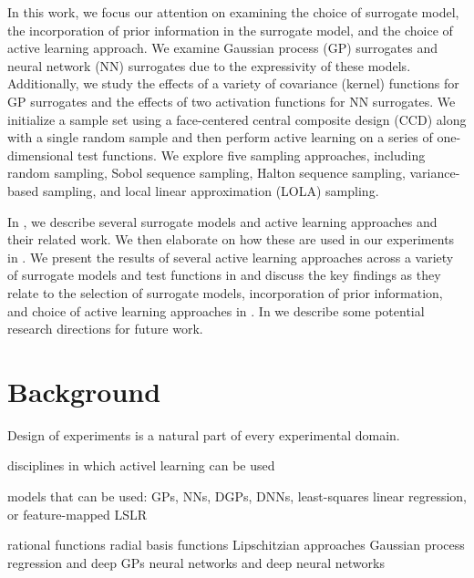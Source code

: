 \documentclass[conference]{IEEEtran}
\begin{document}
	In this work, we focus our attention on examining the choice of surrogate model, the incorporation of prior information in the surrogate model, and the choice of active learning approach. We examine Gaussian process (GP) surrogates and neural network (NN) surrogates due to the expressivity of these models. Additionally, we study the effects of a variety of covariance (kernel) functions for GP surrogates and the effects of two activation functions for NN surrogates. We initialize a sample set using a face-centered central composite design (CCD) along with a single random sample and then perform active learning on a series of one-dimensional test functions. We explore five sampling approaches, including random sampling, Sobol sequence sampling, Halton sequence sampling, variance-based sampling, and local linear approximation (LOLA) sampling.
	
    In , we describe several surrogate models and active learning approaches and their related work. We then elaborate on how these are used in our experiments in . We present the results of several active learning approaches across a variety of surrogate models and test functions in  and discuss the key findings as they relate to the selection of surrogate models, incorporation of prior information, and choice of active learning approaches in . In  we describe some potential research directions for future work.
	
	\section{Background}
	\label{sec:background}
	
	Design of experiments is a natural part of every experimental domain.
	
	disciplines in which activel learning can be used
	
	models that can be used: GPs, NNs, DGPs, DNNs, least-squares linear regression, or feature-mapped LSLR
	
	rational functions \cite{Hendrickx2005SequentialMetamodelling}
	radial basis functions \cite{Mackman2010InvestigationFunctions}
	Lipschitzian approaches \cite{Lovison2010AdaptiveMetamodeling}
	Gaussian process regression \cite{Simpson2001SamplingAnalysis,VanBeers2005KrigingOverview} and deep GPs \cite{Damianou2013DeepProcesses} 
	neural networks \cite{Eason2014AdaptiveNetworks} and deep neural networks
	
\end{document}
